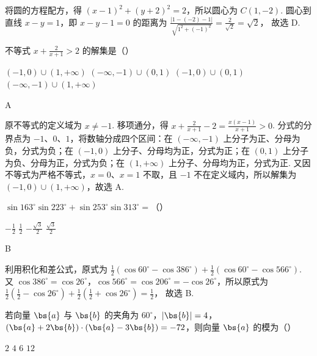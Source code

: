 \begin{solution}
将圆的方程配方，得 \((x-1)^2+(y+2)^2=2\)，所以圆心为 \(C(1,-2)\). 圆心到直线 \(x-y=1\)，即 \(x-y-1=0\) 的距离为 \(\frac{|1-(-2)-1|}{\sqrt{1^2+(-1)^2}}=\frac{2}{\sqrt{2}}=\sqrt{2}\)，
故选 D.
\end{solution}

\begin{problem}
不等式 \(x + \frac{2}{x + 1} > 2\) 的解集是（\quad）

\choices
    {\((-1,0)\cup (1, + \infty)\)}
    {\((-\infty, -1) \cup (0, 1)\)}
    {\((-1,0)\cup (0,1)\)}
    {\((-\infty, -1) \cup (1, + \infty)\)}
\end{problem}

\begin{answer}
A
\end{answer}

\begin{solution}
原不等式的定义域为 \(x\neq-1\). 移项通分，得 \(x+\frac{2}{x+1}-2=\frac{x(x-1)}{x+1}>0\). 分式的分界点为 \(-1\)、\(0\)、\(1\)，将数轴分成四个区间：在 \((- \infty,-1)\) 上分子为正、分母为负，分式为负；在 \((-1,0)\) 上分子、分母均为正，分式为正；在 \((0,1)\) 上分子为负、分母为正，分式为负；在 \((1,+\infty)\) 上分子、分母均为正，分式为正. 又因不等式为严格不等式，\(x=0\)、\(x=1\) 不取，且 \(-1\) 不在定义域内，所以解集为 \((-1,0)\cup(1,+\infty)\)，故选 A.
\end{solution}

\begin{problem}
\(\sin 163^{\circ}\sin 223^{\circ} + \sin 253^{\circ}\sin 313^{\circ} =\)（\quad）

\choices
    {\(-\frac{1}{2}\)}
    {\(\frac{1}{2}\)}
    {\(-\frac{\sqrt{3}}{2}\)}
    {\(\frac{\sqrt{3}}{2}\)}
\end{problem}

\begin{answer}
B
\end{answer}

\begin{solution}
利用积化和差公式，原式为 \(\frac{1}{2}\left(\cos60^\circ-\cos386^\circ\right)+\frac{1}{2}\left(\cos60^\circ-\cos566^\circ\right)\). 又 \(\cos386^\circ=\cos26^\circ\)，\(\cos566^\circ=\cos206^\circ=-\cos26^\circ\)，所以原式为 \(\frac{1}{2}\left(\frac{1}{2}-\cos26^\circ\right)+\frac{1}{2}\left(\frac{1}{2}+\cos26^\circ\right)=\frac{1}{2}\)，
故选 B.
\end{solution}

\begin{problem}
若向量 \(\bs{a}\) 与 \(\bs{b}\) 的夹角为 \(60^{\circ}\)，\(\left|\bs{b}\right| = 4\)，\(\left(\bs{a} + 2\bs{b}\right) \cdot \left(\bs{a} - 3\bs{b}\right) = -72\)，则向量 \(\bs{a}\) 的模为（\quad）

\choices
    {\(2\)}
    {\(4\)}
    {\(6\)}
    {\(12\)}
\end{problem}

